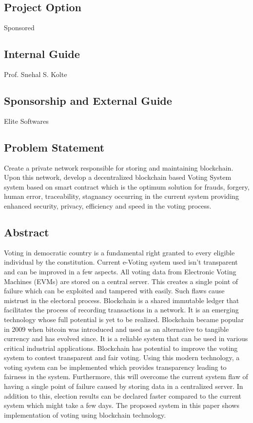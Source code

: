 \documentclass[oneside, 12pt]{book}
\begin{document}
		\subsection{Project Option}
			Sponsored
		\subsection{Internal Guide}
			Prof. Snehal S. Kolte
		\subsection{Sponsorship and External Guide}
			Elite Softwares
		\subsection{Problem Statement}
			Create a private network responsible for storing and maintaining blockchain. Upon this network, develop a decentralized blockchain based Voting System system based on smart contract which is the optimum solution for frauds, forgery, human error, traceability, stagnancy occurring in the current system providing enhanced security, privacy, efficiency and speed in the voting process.
		\subsection{Abstract}
			Voting in democratic country is a fundamental right granted to every eligible individual by the constitution. Current e-Voting system used isn’t transparent and can be improved in a few aspects. All voting data from Electronic Voting Machines (EVMs) are stored on a central server. This creates a single point of failure which can be exploited and tampered with easily. Such flaws cause mistrust in the electoral process. Blockchain is a shared  immutable ledger that facilitates the process of recording transactions in a network. It is an emerging technology whose full potential is yet to be realized. Blockchain became popular in 2009 when bitcoin was introduced and used as an alternative to tangible currency and has evolved since. It is a reliable system that can be used in various critical industrial applications. Blockchain has potential to improve the voting system to contest transparent and fair voting. Using this modern technology, a voting system can be implemented which provides transparency leading to fairness in the system. Furthermore, this will overcome the current system flaw of having a single point of failure caused by storing data in a centralized server. In addition to this, election results can be declared faster compared to the current system which might take a few days. The proposed system in this paper shows implementation of voting using blockchain technology.
\end{document}
